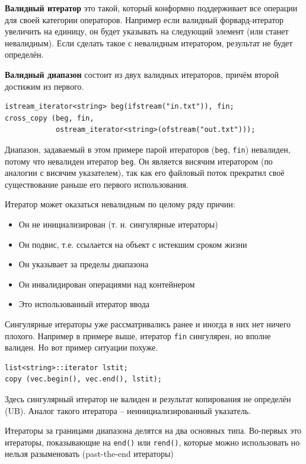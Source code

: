 \documentclass[a4paper,12pt,oneside]{article}
\begin{document}
\textbf{Валидный итератор} это такой, который конформно поддерживает все операции для своей категории операторов. Например если валидный форвард-итератор увеличить на единицу, он будет указывать на следующий элемент (или станет невалидным). Если сделать такое с невалидным итератором, результат не будет определён.

\textbf{Валидный диапазон} состоит из двух валидных итераторов, причём второй достижим из первого.

\begin{lstlisting}
istream_iterator<string> beg(ifstream("in.txt")), fin;
cross_copy (beg, fin,
            ostream_iterator<string>(ofstream("out.txt")));
\end{lstlisting}

Диапазон, задаваемый в этом примере парой итераторов (\lstinline!beg!, \lstinline!fin!) невалиден, потому что невалиден итератор \lstinline!beg!. Он является висячим итератором (по аналогии с висячим указателем), так как его файловый поток прекратил своё существование раньше его первого использования.

Итератор может оказаться невалидным по целому ряду причин:

\begin{itemize}
\item Он не инициализирован (т. н. сингулярные итераторы)
\item Он подвис, т.е. ссылается на объект с истекшим сроком жизни
\item Он указывает за пределы диапазона
\item Он инвалидирован операциями над контейнером
\item Это использованный итератор ввода
\end{itemize}

Сингулярные итераторы уже рассматривались ранее и иногда в них нет ничего плохого. Например в примере выше, итератор \lstinline!fin! сингулярен, но вполне валиден. Но вот пример ситуации похуже.

\begin{lstlisting}
list<string>::iterator lstit;
copy (vec.begin(), vec.end(), lstit);
\end{lstlisting}

Здесь сингулярный итератор не валиден и результат копирования не определён (UB). Аналог такого итератора -- неинициализированный указатель.

Итераторы за границами диапазона делятся на два основных типа. Во-первых это итераторы, показывающие на \lstinline!end()! или \lstinline!rend()!, которые можно использовать но нельзя разыменовать (past-the-end итераторы) 
\end{document}
